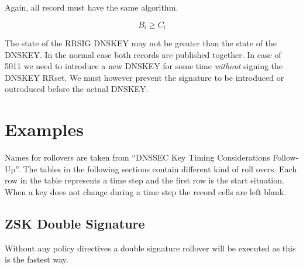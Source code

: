 \documentclass[twoside, a4paper]{article}
\begin{document}
Again, all record must have the same algorithm.

\begin{equation}
B_{i} \geq C_{i}
\end{equation}

The state of the RRSIG DNSKEY may not be greater than the state of the
DNSKEY. In the normal case both records are published together. In case
of 5011 we need to introduce a new DNSKEY for some time \emph{without}
signing the DNSKEY RRset. We must however prevent the signature to be 
introduced or outroduced before the actual DNSKEY.

\section{Examples}

Names for rollovers are taken from ``DNSSEC Key Timing 
Considerations Follow-Up''. The tables in the following sections 
contain different kind of roll overs. Each row in the table 
represents a time step and the first row is the start situation. 
When a key does not change during a time step the record cells are left 
blank.

\subsection{ZSK Double Signature}
Without any policy directives a double signature rollover will be executed
as this is the fastest way.
\end{document}
